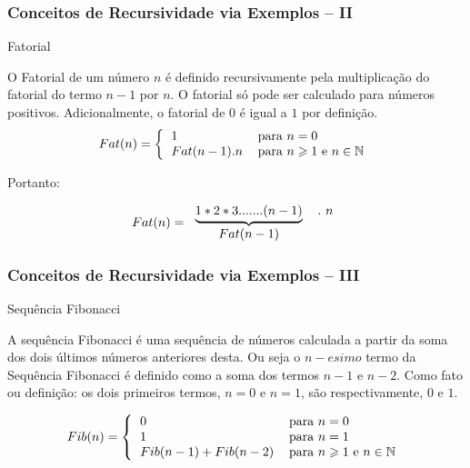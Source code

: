 \begin{frame}[fragile]
\frametitle{Conceitos de Recursividade via Exemplos -- II}


\begin{block}{Fatorial}

O Fatorial de um número $n$ é definido  recursivamente pela
 multiplicação do fatorial do termo $n-1$ por $n$. 
  O fatorial só pode ser calculado para números positivos. 
  Adicionalmente, o fatorial de $0$ é igual a 
  $1$ por definição.
    \[ 
    Fat(n)=\left\{
    \begin{tabular}[c]{ll}%
        $1$ & para $n = 0$\\
        $Fat(n-1) . n$ & para $n\geqslant1$ e $n \in \mathbb{N}$
    \end{tabular}
    \right.
    \]
    
    Portanto:
    
    \[
    Fat(n)=
    \begin{tabular}
        [c]{cc}%
        $\underbrace{1\ast2\ast3 . ..... . (n-1)}$ & $ .  \ n$\\
        $Fat(n-1)$ &
    \end{tabular}
    \]

\end{block}    
\end{frame}


\begin{frame}[fragile]
\frametitle{Conceitos de Recursividade via Exemplos -- III}

\begin{block}{Sequência Fibonacci}

A sequência Fibonacci é uma sequência de números calculada a partir da soma dos
dois últimos números anteriores desta. Ou seja o $n-esimo$ termo da Sequência Fibonacci é definido como a soma dos termos $n-1$ e $n-2$. Como fato ou definição: os dois primeiros termos, $n = 0$ e $n = 1$, são respectivamente, $0$ e $1$.
      
      \[
      Fib(n)=\left\{
      \begin{tabular}[c]{ll}%
          $0$ & para $n = 0$\\
          $1$ & para $n = 1$\\
          $Fib(n-1) + Fib(n-2)$ & para $n\geqslant1$ e $n \in \mathbb{N}$
      \end{tabular}
      \right.
      \]
 
\end{block}    
\end{frame}

